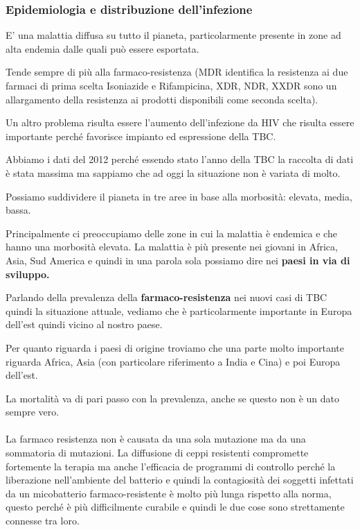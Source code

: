 \subsubsection{Epidemiologia e distribuzione dell'infezione}


E' una malattia diffusa su tutto il pianeta, particolarmente presente in
zone ad alta endemia dalle quali può essere esportata.

Tende sempre di più alla farmaco-resistenza (MDR identifica la
resistenza ai due farmaci di prima scelta Isoniazide e Rifampicina, XDR,
NDR, XXDR sono un allargamento della resistenza ai prodotti disponibili
come seconda scelta).

Un altro problema risulta essere l'aumento dell'infezione da HIV che
risulta essere importante perché favorisce impianto ed espressione della
TBC.

Abbiamo i dati del 2012 perché essendo stato l'anno della TBC la
raccolta di dati è stata massima ma sappiamo che ad oggi la situazione
non è variata di molto.

Possiamo suddividere il pianeta in tre aree in base alla morbosità:
elevata, media, bassa.

Principalmente ci preoccupiamo delle zone in cui la malattia è endemica
e che hanno una morbosità elevata. La malattia è più presente nei
giovani in Africa, Asia, Sud America e quindi in una parola sola
possiamo dire nei \textbf{paesi in via di sviluppo.}

Parlando della prevalenza della \textbf{farmaco-resistenza} nei nuovi
casi di TBC quindi la situazione attuale, vediamo che è particolarmente
importante in Europa dell'est quindi vicino al nostro paese.

Per quanto riguarda i paesi di origine troviamo che una parte molto
importante riguarda Africa, Asia (con particolare riferimento a India e
Cina) e poi Europa dell'est.

La mortalità va di pari passo con la prevalenza, anche se questo non è
un dato sempre vero.
\\\\
La farmaco resistenza non è causata da una sola mutazione ma da una
sommatoria di mutazioni. La diffusione di ceppi resistenti compromette
fortemente la terapia ma anche l'efficacia de programmi di controllo
perché la liberazione nell'ambiente del batterio e quindi la
contagiosità dei soggetti infettati da un micobatterio
farmaco-resistente è molto più lunga rispetto alla norma, questo perché
è più difficilmente curabile e quindi le due cose sono strettamente
connesse tra loro.

